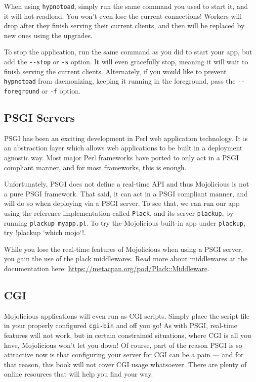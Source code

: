When using \verb!hypnotoad!, simply run the same command you used to start it, and it will hot-readload.
You won't even lose the current connections!
Workers will drop after they finish serving their current clients, and then will be replaced by new ones using the upgrades.

To stop the application, run the same command as you did to start your app, but add the \verb!--stop! or \verb!-s! option.
It will even gracefully stop, meaning it will wait to finish serving the current clients.
Alternately, if you would like to prevent \verb!hypnotoad! from daemonizing, 
keeping it running in the foreground, pass the \verb!--foreground! or \verb!-f! option.


\subsection{PSGI Servers}

PSGI has been an exciting development in Perl web application technology.
It is an abstraction layer which allows web applications to be built in a deployment agnostic way.
Most major Perl frameworks have ported to only act in a PSGI compliant manner, and for most frameworks, this is enough.

Unfortunately, PSGI does not define a real-time API and thus Mojolicious is not a pure PSGI framework.
That said, it can act in a PSGI compliant manner, and will do so when deploying via a PSGI server.
To see that, we can run our app using the reference implementation called \verb!Plack!, and its server \verb!plackup!, by running \verb!plackup myapp.pl!.
To try the Mojolicious built-in app under \verb!plackup!, try \lstbash!plackup `which mojo`!.

While you lose the real-time features of Mojolicious when using a PSGI server, you gain the use of the plack middlewares.
Read more about middlewares at the documentation here: \url{https://metacpan.org/pod/Plack::Middleware}.

\subsection{CGI}

Mojolicious applications will even run as CGI scripts.
Simply place the script file in your properly configured \verb!cgi-bin! and off you go!
As with PSGI, real-time features will not work, but in certain constrained situations, where CGI is all you have, Mojolicious won't let you down!
Of course, part of the reason PSGI is so attractive now is that configuring your server for CGI can be a pain ---
and for that reason, this book will not cover CGI usage whatsoever.
There are plenty of online resources that will help you find your way.


